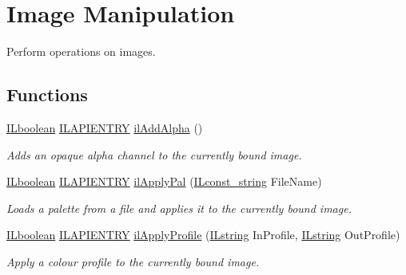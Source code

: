\hypertarget{group__image__manip}{\section{Image Manipulation}
\label{group__image__manip}
}


Perform operations on images.  


\subsection*{Functions}
\begin{DoxyCompactItemize}
\item 
\hyperlink{group__il__types_gaa6aa7c95cfdc06b4d8601ef832b7bb0a}{I\+Lboolean} \hyperlink{_i_l_8h_a69c08a8d06df986f7e46f209d131ef2f}{I\+L\+A\+P\+I\+E\+N\+T\+R\+Y} \hyperlink{group__image__manip_ga0e950cae1c2b697137d8e39a56a2602a}{il\+Add\+Alpha} ()
\begin{DoxyCompactList}\small\item\em Adds an opaque alpha channel to the currently bound image. \end{DoxyCompactList}\item 
\hyperlink{group__il__types_gaa6aa7c95cfdc06b4d8601ef832b7bb0a}{I\+Lboolean} \hyperlink{_i_l_8h_a69c08a8d06df986f7e46f209d131ef2f}{I\+L\+A\+P\+I\+E\+N\+T\+R\+Y} \hyperlink{group__image__manip_ga014c750459309c1df11cd535b6440786}{il\+Apply\+Pal} (\hyperlink{group__il__types_ga1aa1edc3eb344e14acacb02bade24a5a}{I\+Lconst\+\_\+string} File\+Name)
\begin{DoxyCompactList}\small\item\em Loads a palette from a file and applies it to the currently bound image. \end{DoxyCompactList}\item 
\hyperlink{group__il__types_gaa6aa7c95cfdc06b4d8601ef832b7bb0a}{I\+Lboolean} \hyperlink{_i_l_8h_a69c08a8d06df986f7e46f209d131ef2f}{I\+L\+A\+P\+I\+E\+N\+T\+R\+Y} \hyperlink{group__image__manip_gad41bda3bd56aa5df16c34b98c8a50224}{il\+Apply\+Profile} (\hyperlink{group__il__types_ga683acc99ae9bac7978edfa5588962b52}{I\+Lstring} In\+Profile, \hyperlink{group__il__types_ga683acc99ae9bac7978edfa5588962b52}{I\+Lstring} Out\+Profile)
\begin{DoxyCompactList}\small\item\em Apply a colour profile to the currently bound image. \end{DoxyCompactList}\item 

\end{DoxyCompactItemize}
